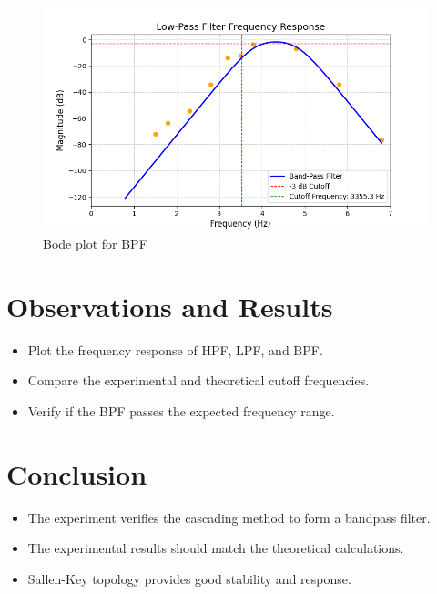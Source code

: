 \documentclass[a4paper,12pt]{article}
\begin{document}
\begin{figure}[H]
    \centering
    \hfill
\end{figure}
\begin{figure}[H]
    \centering
    \includegraphics[width=\textwidth]{figs/band.png}
    \caption{Bode plot for BPF}
\end{figure}
\section{Observations and Results}
\begin{itemize}
    \item Plot the frequency response of HPF, LPF, and BPF.
    \item Compare the experimental and theoretical cutoff frequencies.
    \item Verify if the BPF passes the expected frequency range.
\end{itemize}

\section{Conclusion}
\begin{itemize}
    \item The experiment verifies the cascading method to form a bandpass filter.
    \item The experimental results should match the theoretical calculations.
    \item Sallen-Key topology provides good stability and response.
\end{itemize}
\end{document}
